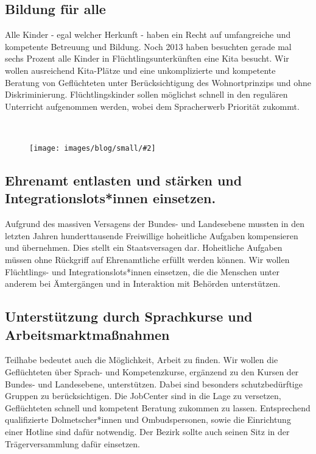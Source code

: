 \documentclass[a4paper,10pt]{article}
\newcommand{\mysection}[1]{{\vspace{1cm}\noindent\color{gray}{\ttfamily\LARGE\raggedright #1}\\\medskip}}
\newcommand{\abschnitt}[2]{%
\mysection{\raggedright #1}%
\begin{figure}[t]%
\vspace*{-2.7cm}%
\hspace*{-2.1cm}%
\texttt{[image: images/blog/small/\#2]} %
\end{figure}%
}
\begin{document}
\subsection*{\ttfamily Bildung für alle}\label{bildung-fuxfcr-alle}

Alle Kinder - egal welcher Herkunft - haben ein Recht auf umfangreiche
und kompetente Betreuung und Bildung. Noch 2013 haben besuchten gerade
mal sechs Prozent alle Kinder in Flüchtlingsunterkünften eine Kita
besucht. Wir wollen ausreichend Kita-Plätze und eine unkomplizierte und
kompetente Beratung von Geflüchteten unter Berücksichtigung des
Wohnortprinzips und ohne Diskriminierung. Flüchtlingskinder sollen
möglichst schnell in den regulären Unterricht aufgenommen werden, wobei
dem Spracherwerb Priorität zukommt.

\clearpage
\abschnitt{}{racistyouare.png}
\subsection*{\ttfamily Ehrenamt entlasten und stärken und Integrationslots*innen
einsetzen.}\label{ehrenamt-entlasten-und-stuxe4rken-und-integrationslotsinnen-einsetzen.}

Aufgrund des massiven Versagens der Bundes- und Landesebene mussten in
den letzten Jahren hunderttausende Freiwillige hoheitliche Aufgaben
kompensieren und übernehmen. Dies stellt ein Staatsversagen dar.
Hoheitliche Aufgaben müssen ohne Rückgriff auf Ehrenamtliche erfüllt
werden können. Wir wollen Flüchtlings- und Integrationslots*innen
einsetzen, die die Menschen unter anderem bei Ämtergängen und in
Interaktion mit Behörden unterstützen.

\subsection*{\ttfamily Unterstützung durch Sprachkurse und
Arbeitsmarktmaßnahmen}\label{unterstuxfctzung-durch-sprachkurse-und-arbeitsmarktmauxdfnahmen}

Teilhabe bedeutet auch die Möglichkeit, Arbeit zu finden. Wir wollen die
Geflüchteten über Sprach- und Kompetenzkurse, ergänzend zu den Kursen
der Bundes- und Landesebene, unterstützen. Dabei sind besonders
schutzbedürftige Gruppen zu berücksichtigen. Die JobCenter sind in die
Lage zu versetzen, Geflüchteten schnell und kompetent Beratung zukommen
zu lassen. Entsprechend qualifizierte Dolmetscher*innen und
Ombudspersonen, sowie die Einrichtung einer Hotline sind dafür
notwendig. Der Bezirk sollte auch seinen Sitz in der Trägerversammlung
dafür einsetzen.
\end{document}
